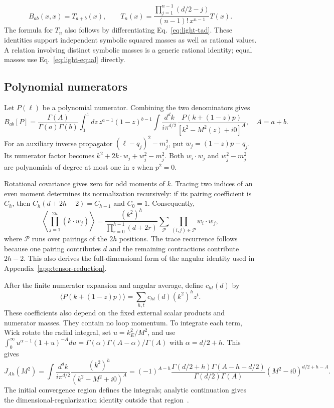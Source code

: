 \begin{equation}
 B_{ab}(x,x)=T_{a+b}(x),\qquad
 T_n(x)=\frac{\prod_{j=1}^{n-1}(d/2-j)}{(n-1)!\,x^{n-1}}T(x).
 \label{eq:light-equal}
\end{equation}
The formula for $T_n$ also follows by differentiating Eq.~\eqref{eq:light-tad}. These identities support independent symbolic squared masses as well as rational values. A relation involving distinct symbolic masses is a generic rational identity; equal masses use Eq.~\eqref{eq:light-equal} directly.

\subsection{Polynomial numerators}
Let $P(\ell)$ be a polynomial numerator. Combining the two denominators gives
\begin{equation}
 B_{ab}[P]=\frac{\Gamma(A)}{\Gamma(a)\Gamma(b)}\int_0^1 dz\,
 z^{a-1}(1-z)^{b-1}\int\frac{d^dk}{i\pi^{d/2}}
 \frac{P(k+(1-z)p)}{[k^2-M^2(z)+i0]^A},\quad A=a+b.
 \label{eq:light-parameter}
\end{equation}
For an auxiliary inverse propagator $(\ell-q_j)^2-m_j^2$, put $w_j=(1-z)p-q_j$. Its numerator factor becomes $k^2+2k\cdot w_j+w_j^2-m_j^2$. Both $w_i\cdot w_j$ and $w_j^2-m_j^2$ are polynomials of degree at most one in $z$ when $p^2=0$.

Rotational covariance gives zero for odd moments of $k$. Tracing two indices of an even moment determines its normalization recursively: if its pairing coefficient is $C_h$, then $C_h(d+2h-2)=C_{h-1}$ and $C_0=1$. Consequently,
\begin{equation}
 \left\langle\prod_{j=1}^{2h}(k\cdot w_j)\right\rangle
 =\frac{(k^2)^h}{\prod_{r=0}^{h-1}(d+2r)}
 \sum_{\mathcal P}\prod_{(i,j)\in\mathcal P}w_i\cdot w_j,
 \label{eq:light-angular}
\end{equation}
where $\mathcal P$ runs over pairings of the $2h$ positions. The trace recurrence follows because one pairing contributes $d$ and the remaining contractions contribute $2h-2$. This also derives the full-dimensional form of the angular identity used in Appendix~\ref{app:tensor-reduction}.

After the finite numerator expansion and angular average, define $c_{ht}(d)$ by
\begin{equation}
 \langle P(k+(1-z)p)\rangle=\sum_{h,t}c_{ht}(d)(k^2)^h z^t.
 \label{eq:light-polynomial}
\end{equation}
These coefficients also depend on the fixed external scalar products and numerator masses. They contain no loop momentum. To integrate each term, Wick rotate the radial integral, set $u=k_E^2/M^2$, and use
$\int_0^\infty u^{\alpha-1}(1+u)^{-A}du=\Gamma(\alpha)\Gamma(A-\alpha)/\Gamma(A)$ with $\alpha=d/2+h$. This gives
\begin{equation}
 J_{Ah}(M^2)=\int\frac{d^dk}{i\pi^{d/2}}\frac{(k^2)^h}{(k^2-M^2+i0)^A}
 =(-1)^{A-h}\frac{\Gamma(d/2+h)\Gamma(A-h-d/2)}{\Gamma(d/2)\Gamma(A)}
 (M^2-i0)^{d/2+h-A}.
 \label{eq:light-radial}
\end{equation}
The initial convergence region defines the integrals; analytic continuation gives the dimensional-regularization identity outside that region~\cite{Weinzierl2022}.

